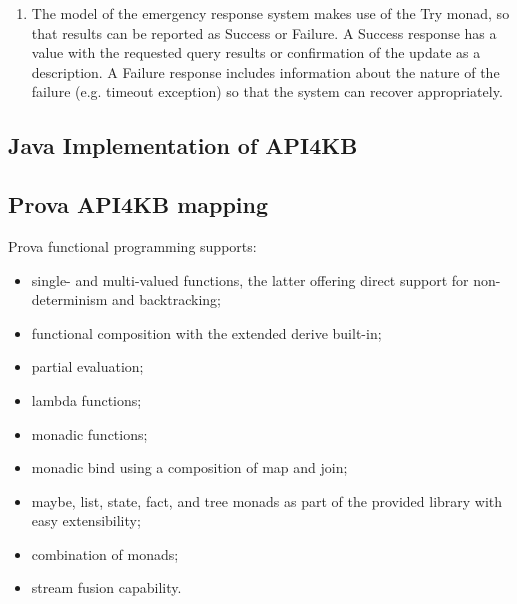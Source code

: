 \documentclass[runningheads]{llncs}
\begin{document}
\begin{enumerate}
\item The model of the emergency response system makes use of the Try monad, so that results can be reported as Success or Failure. A Success response has a value with the requested query results or confirmation of the update as a description. A Failure response includes information about the nature of the failure (e.g. timeout exception) so that the system can recover appropriately.

\end{enumerate}

  

\subsection{Java Implementation of API4KB}



\subsection{Prova API4KB mapping}

Prova functional programming supports:

\begin{itemize}
  \item single- and multi-valued functions, the latter offering direct support for non-determinism and backtracking;
  \item functional composition with the extended derive built-in;
  \item partial evaluation;
  \item lambda functions;
  \item monadic functions;
  \item monadic bind using a composition of map and join;
  \item maybe, list, state, fact, and tree monads as part of the provided library with easy extensibility;
  \item combination of monads;
  \item stream fusion capability.
\end{itemize}
\end{document}
